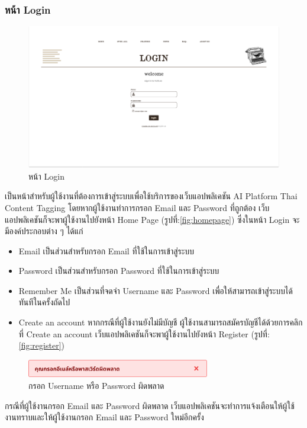 \documentclass[12pt,oneside,openright,a4paper]{cpe-thai-project}
\begin{document}
\begin{itemize}
\subsubsection{หน้า Login}
\begin{figure}[!ht]\centering
  \includegraphics[width=14cm]{./img/project_ui/login.png} 
  \caption{หน้า Login}\label{fig:login} 
\end{figure}
\hspace*{1cm}เป็นหน้าสำหรับผู้ใช้งานที่ต้องการเข้าสู่ระบบเพื่อใช้บริการของเว็บแอปพลิเคชัน AI Platform Thai Content Tagging 
โดยหากผู้ใช้งานทำการกรอก Email และ Password ที่ถูกต้อง เว็บแอปพลิเคชันก็จะพาผู้ใช้งานไปยังหน้า Home Page (รูปที่:\ref{fig:homepage})
ซึ่งในหน้า Login จะมีองค์ประกอบต่าง ๆ ได้แก่ 
\begin{itemize}
  \item Email เป็นส่วนสำหรับกรอก Email ที่ใช้ในการเข้าสู่ระบบ
  \item Password เป็นส่วนสำหรับกรอก Password ที่ใช้ในการเข้าสู่ระบบ
  \item Remember Me เป็นส่วนที่จดจำ Username และ Password เพื่อให้สามารถเข้าสู่ระบบได้ทันทีในครั้งถัดไป
  \item Create an account หากกรณีที่ผู้ใช้งานยังไม่มีบัญชี ผู้ใช้งานสามารถสมัครบัญชีได้ด้วยการคลิกที่ Create an account เว็บแอปพลิเคชันก็จะพาผู้ใช้งานไปยังหน้า Register (รูปที่:\ref{fig:register})
\end{itemize}
\begin{figure}[!ht]\centering
  \includegraphics[width=8cm]{./img/project_ui/login_fail.png} 
  \caption{กรอก Username หรือ Password ผิดพลาด}\label{fig:login_fail} 
\end{figure}
\hspace*{1cm}กรณีที่ผู้ใช้งานกรอก Email และ Password ผิดพลาด เว็บแอปพลิเคชันจะทำการแจ้งเตือนให้ผู้ใช้งานทราบและให้ผู้ใช้งานกรอก Email และ Password ใหม่อีกครั้ง


\end{itemize}
\end{document}
